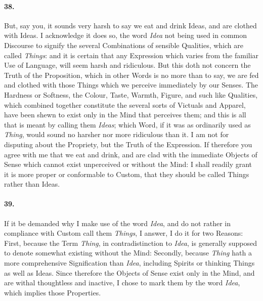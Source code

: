 \documentclass[]{article}
\newenvironment{sectionbody}{\begin{multicols}{2}}{\end{multicols}}
\begin{document}
\begin{sectionbody}
\paragraph{38.} But, say you, it sounds very harsh to say we eat and drink Ideas,
and are clothed with Ideas.  I acknowledge it does so, the word
\emph{Idea} not being used in common Discourse to signify the
several Combinations of sensible Qualities, which are called
\emph{Things}: and it is certain that any Expression which
varies from the familiar Use of Language, will seem harsh and
ridiculous.  But this doth not concern the Truth of the
Proposition, which in other Words is no more than to say, we are
fed and clothed with those Things which we perceive immediately
by our Senses.  The Hardness or Softness, the Colour, Taste,
Warmth, Figure, and such like Qualities, which combined together
constitute the several sorts of Victuals and Apparel, have been
shewn to exist only in the Mind that perceives them; and this is
all that is meant by calling them \emph{Ideas}; which Word, if
it was as ordinarily used as \emph{Thing}, would sound no
harsher nor more ridiculous than it.  I am not for disputing
about the Propriety, but the Truth of the Expression.  If
therefore you agree with me that we eat and drink, and are clad
with the immediate Objects of Sense which cannot exist
unperceived or without the Mind: I shall readily grant it is more
proper or conformable to Custom, that they should be called
Things rather than Ideas.



\paragraph{39.} If it be demanded why I make use of the word \emph{Idea}, and
do not rather in compliance with Custom call them
\emph{Things}, I answer, I do it for two Reasons: First,
because the Term \emph{Thing}, in contradistinction to
\emph{Idea}, is generally supposed to denote somewhat existing
without the Mind: Secondly, because \emph{Thing} hath a more
comprehensive Signification than \emph{Idea}, including Spirits
or thinking Things as well as Ideas.  Since therefore the Objects
of Sense exist only in the Mind, and are withal thoughtless and
inactive, I chose to mark them by the word \emph{Idea}, which
implies those Properties.




\end{sectionbody}
\end{document}
